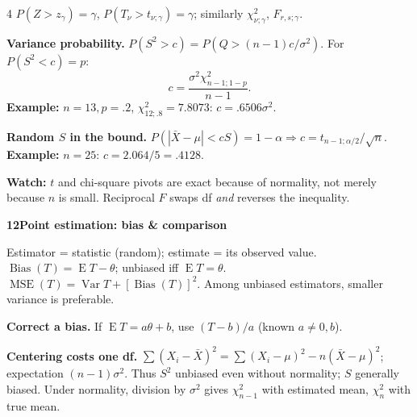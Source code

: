 \documentclass[a4paper,landscape]{article}
\newcommand{\head}[2][late]{\par\vspace{3pt}\noindent\colorbox{#1}{\parbox{\dimexpr\linewidth-6pt}{\color{white}\bfseries #2}}\par\vspace{1pt}}
\newcommand{\cue}[1]{\par\textbf{#1}\enspace}
\newcommand{\trap}[1]{\par{\color{alert}\textbf{Watch:} #1}}
\newcommand{\E}{\operatorname{E}}
\newcommand{\V}{\operatorname{Var}}
\newcommand{\Xb}{\bar X}
\begin{document}
\begin{multicols*}{4}
\(P(Z>z_\gamma)=\gamma\), \(P(T_\nu>t_{\nu;\gamma})=\gamma\); similarly \(\chi^2_{\nu;\gamma}\), \(F_{r,s;\gamma}\).
\cue{Variance probability.} \(P(S^2>c)=P(Q>(n-1)c/\sigma^2)\). For \(P(S^2<c)=p\):
\[c=\frac{\sigma^2\chi^2_{n-1;1-p}}{n-1}.\]
\textbf{Example:} \(n=13,p=.2\), \(\chi^2_{12;.8}=7.8073\): \(c=.6506\sigma^2\).
\cue{Random \(S\) in the bound.}
\(P(|\Xb-\mu|<cS)=1-\alpha\Rightarrow c=t_{n-1;\alpha/2}/\sqrt n\).
\textbf{Example:} \(n=25\): \(c=2.064/5=.4128\).
\trap{\(t\) and chi-square pivots are exact because of normality, not merely because \(n\) is small. Reciprocal \(F\) swaps df \emph{and} reverses the inequality.}
\head{12\quad Point estimation: bias \& comparison}
Estimator = statistic (random); estimate = its observed value.
\(\operatorname{Bias}(T)=\E T-\theta\); unbiased iff \(\E T=\theta\).
\(\operatorname{MSE}(T)=\V T+[\operatorname{Bias}(T)]^2\).
Among unbiased estimators, smaller variance is preferable.
\cue{Correct a bias.} If \(\E T=a\theta+b\), use \((T-b)/a\) (known \(a\ne0,b\)).
\cue{Centering costs one df.} \(\sum(X_i-\Xb)^2=\sum(X_i-\mu)^2-n(\Xb-\mu)^2\); expectation \((n-1)\sigma^2\). Thus \(S^2\) unbiased even without normality; \(S\) generally biased. Under normality, division by \(\sigma^2\) gives \(\chi^2_{n-1}\) with estimated mean, \(\chi^2_n\) with true mean.
\end{multicols*}
\newpage
\end{document}
